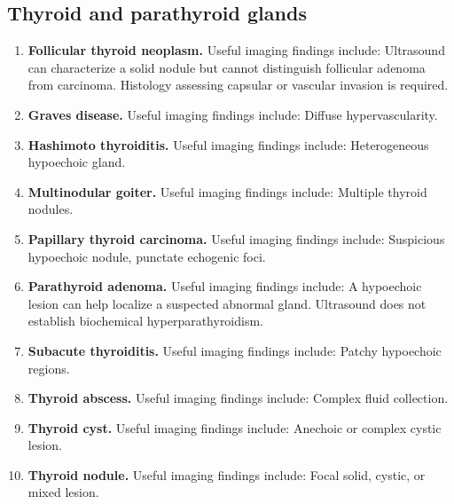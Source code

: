 \subsection{Thyroid and parathyroid glands}
\begin{enumerate}[leftmargin=*,itemsep=0.45em,topsep=0.4em]
\item \textbf{Follicular thyroid neoplasm.} Useful imaging findings include: Ultrasound can characterize a solid nodule but cannot distinguish follicular adenoma from carcinoma. Histology assessing capsular or vascular invasion is required.
\item \textbf{Graves disease.} Useful imaging findings include: Diffuse hypervascularity.
\item \textbf{Hashimoto thyroiditis.} Useful imaging findings include: Heterogeneous hypoechoic gland.
\item \textbf{Multinodular goiter.} Useful imaging findings include: Multiple thyroid nodules.
\item \textbf{Papillary thyroid carcinoma.} Useful imaging findings include: Suspicious hypoechoic nodule, punctate echogenic foci.
\item \textbf{Parathyroid adenoma.} Useful imaging findings include: A hypoechoic lesion can help localize a suspected abnormal gland. Ultrasound does not establish biochemical hyperparathyroidism.
\item \textbf{Subacute thyroiditis.} Useful imaging findings include: Patchy hypoechoic regions.
\item \textbf{Thyroid abscess.} Useful imaging findings include: Complex fluid collection.
\item \textbf{Thyroid cyst.} Useful imaging findings include: Anechoic or complex cystic lesion.
\item \textbf{Thyroid nodule.} Useful imaging findings include: Focal solid, cystic, or mixed lesion.
\end{enumerate}

